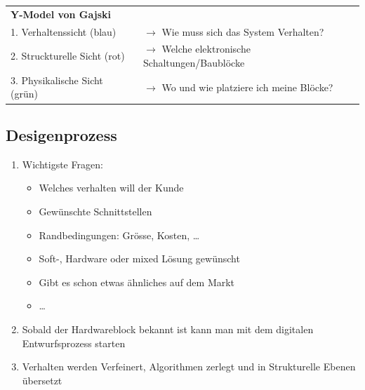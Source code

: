 \begin{minipage}{0.6\textwidth}
	\begin{tabular}{l l }
		\multicolumn{2}{l}{\textbf{Y-Model von Gajski}}\\
		1. Verhaltenssicht (blau)		& $\rightarrow$ Wie muss sich das System Verhalten? \\
		2. Struckturelle Sicht (rot)	& $\rightarrow$ Welche elektronische Schaltungen/Baublöcke\\
		3. Physikalische Sicht (grün)	& $\rightarrow$ Wo und wie platziere ich meine Blöcke?\\
	\end{tabular}
	
	\subsection{Desigenprozess}
	\begin{enumerate}
		\item Wichtigste Fragen:
		\begin{itemize}
			\item Welches verhalten will der Kunde
			\item Gewünschte Schnittstellen 
			\item Randbedingungen: Grösse, Kosten, \dots
			\item Soft-, Hardware oder mixed Lösung gewünscht 
			\item Gibt es schon etwas ähnliches auf dem Markt
			\item \dots
		\end{itemize}
	\end{enumerate}
\end{minipage}

\begin{enumerate}
	\setcounter{enumi}{1}
	\item Sobald der Hardwareblock bekannt ist kann man mit dem digitalen Entwurfsprozess starten 
	\item Verhalten werden Verfeinert, Algorithmen zerlegt und in Strukturelle Ebenen übersetzt	
\end{enumerate}

\newpage


